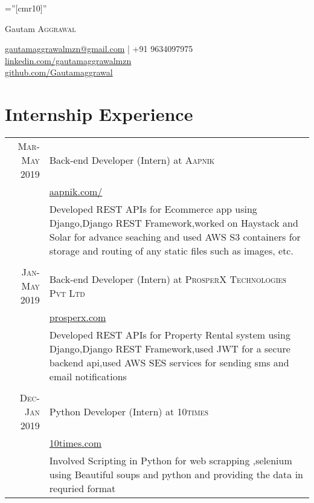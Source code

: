 \documentclass[a4paper,1pt]{article}
\begin{document}

\pagestyle{empty} %

\font\fb=''[cmr10]'' %

\par{\centering
		{\Huge Gautam \textsc{Aggrawal}
		
	}\href{mailto:gautamaggrawalmzn@gmail.com}{gautamaggrawalmzn@gmail.com} | +91 9634097975\\
	\href{https://www.linkedin.com/in/gautamaggrawalmzn/}{linkedin.com/gautamaggrawalmzn}\\
	\href{https://github.com/Gautamaggrawal}{github.com/Gautamaggrawal}\bigskip\par}



\section{Internship Experience}
\begin{tabular}{r|p{11cm}}

 \textsc{  Mar-May 2019} & Back-end Developer (Intern) at \textsc{Aapnik}\\&\href{https://www.aapnik.com/}{aapnik.com/}\\&\footnotesize{Developed REST APIs for Ecommerce app using Django,Django REST Framework,worked on Haystack and Solar for advance seaching and used AWS S3 containers for storage and routing of any static files such as images, etc.}\\\multicolumn{2}{c}{} \\

 \textsc{   Jan-May 2019} & Back-end Developer (Intern) at \textsc{ProsperX Technologies Pvt Ltd}\\&\href{https://prosperx.com/}{prosperx.com}\\&\footnotesize{Developed REST APIs for Property Rental system using Django,Django REST Framework,used JWT for a secure backend api,used AWS SES services for sending sms and email notifications}\\\multicolumn{2}{c}{} \\
 
\textsc{Dec-Jan 2019} & Python Developer (Intern) at \textsc{10times}\\&\href{https://www.10times.com}{10times.com}\\&\footnotesize{Involved Scripting in Python for web scrapping ,selenium using Beautiful soups and python and providing the data in requried format}
\end{tabular}
\end{document}
